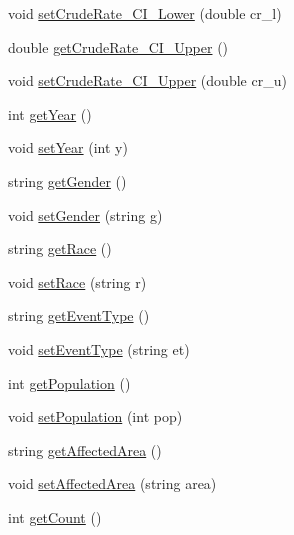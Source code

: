 \begin{DoxyCompactItemize}
\item 
void \hyperlink{classbridges_1_1_cancer_incidence_a58cdb11fa6e8d2766d3ef98b1e8aea1f}{set\+Crude\+Rate\+\_\+\+C\+I\+\_\+\+Lower} (double cr\+\_\+l)
\item 
double \hyperlink{classbridges_1_1_cancer_incidence_aff936126f521c68e37c6de21f026a368}{get\+Crude\+Rate\+\_\+\+C\+I\+\_\+\+Upper} ()
\item 
void \hyperlink{classbridges_1_1_cancer_incidence_a40d654a767d9b20ffa6931591d96d42a}{set\+Crude\+Rate\+\_\+\+C\+I\+\_\+\+Upper} (double cr\+\_\+u)
\item 
int \hyperlink{classbridges_1_1_cancer_incidence_a47b950052e5487e3f6f5e346076927f9}{get\+Year} ()
\item 
void \hyperlink{classbridges_1_1_cancer_incidence_ac4c0d949ebb21dd890afe2714962fa5a}{set\+Year} (int y)
\item 
string \hyperlink{classbridges_1_1_cancer_incidence_ade0a0511bcac235d8b7f1fd17ec200a8}{get\+Gender} ()
\item 
void \hyperlink{classbridges_1_1_cancer_incidence_a994fbc9eb92c2d49b1b93a2eb904f2d8}{set\+Gender} (string g)
\item 
string \hyperlink{classbridges_1_1_cancer_incidence_a0be66745d8ceab243685eaeb2faf4178}{get\+Race} ()
\item 
void \hyperlink{classbridges_1_1_cancer_incidence_a9301e1c0bbf37aeccb74064aafd2d5e9}{set\+Race} (string r)
\item 
string \hyperlink{classbridges_1_1_cancer_incidence_aa44cf7891998043769fa42b100541ce4}{get\+Event\+Type} ()
\item 
void \hyperlink{classbridges_1_1_cancer_incidence_a5b8a7ac53de10c878f0571a7ee17f3a6}{set\+Event\+Type} (string et)
\item 
int \hyperlink{classbridges_1_1_cancer_incidence_afd5f1ebe1c73e25fd131f7800a70e8d7}{get\+Population} ()
\item 
void \hyperlink{classbridges_1_1_cancer_incidence_aaade0295abaeeabb23b9e03d5ffd364a}{set\+Population} (int pop)
\item 
string \hyperlink{classbridges_1_1_cancer_incidence_ae1e80b6cfc3a5f9471d21001878a1b8c}{get\+Affected\+Area} ()
\item 
void \hyperlink{classbridges_1_1_cancer_incidence_a9872d7a2e82ff0f7a676efe46d383d71}{set\+Affected\+Area} (string area)
\item 
int \hyperlink{classbridges_1_1_cancer_incidence_a70c20ca136a173bb920c525c78714c13}{get\+Count} ()
\item 

\end{DoxyCompactItemize}
